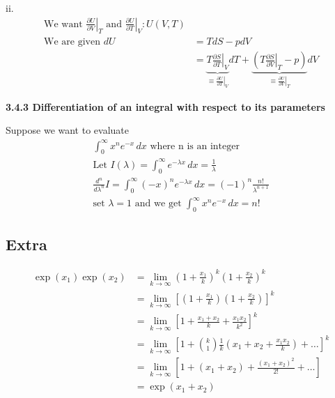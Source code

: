 ii. \begin{align*}
    \text{We want } \left. \frac{\partial U}{\partial V} \right|_{T} \text{ and } \left. \frac{\partial U}{\partial T} \right|_{V} : U(V, T) \\
    \text{We are given } dU &= TdS - pdV \\
    &= \underbrace{T \left. \frac{\partial S}{\partial T} \right|_{V}}_{\equiv \left. \frac{\partial U}{\partial T} \right|_{V}} dT + \underbrace{ \left( T \left. \frac{\partial S}{\partial V} \right|_{T} - p \right)}_{\equiv \left. \frac{\partial U}{\partial V} \right|_{T}} dV
\end{align*} 

\textbf{3.4.3 Differentiation of an integral with respect to its parameters}

\begin{example}
Suppose we want to evaluate
\begin{align*}
    \int_{0}^{\infty} x^n e^{-x} \,dx \text{ where n is an integer} \\
    \text{Let } I(\lambda) = \int_{0}^{\infty} e^{-\lambda x} \,dx = \frac{1}{\lambda} \\
    \frac{d^n}{d \lambda^n} I = \int_{0}^{\infty} (-x)^n e^{-\lambda x} \,dx = (-1)^n \frac{n!}{\lambda^{n + 1}} \\
    \text{set } \lambda = 1 \text{ and we get } \int_{0}^{\infty} x^n e^{-x} \,dx = n!
\end{align*}
\end{example}



\subsection{Extra}

\begin{align*}
    \exp \left(x_1 \right) \exp \left(x_2 \right) &= \lim_{k \to \infty} \left(1 + \frac{x_1}{k}\right)^k \left(1 + \frac{x_2}{k}\right)^k \\
    &= \lim_{k \to \infty} \left[ \left(1 + \frac{x_1}{k}\right)\left(1 + \frac{x_2}{k}\right) \right]^k \\
    &= \lim_{k \to \infty} \left[ 1 + \frac{x_1 + x_2}{k} + \frac{x_1 x_2}{k^2} \right]^k \\
    &= \lim_{k \to \infty} \left[ 1 + \binom{k}{1} \frac{1}{k} \left(x_1 + x_2 + \frac{x_1 x_2}{k} \right) + \dots \right]^k \\
    &= \lim_{k \to \infty} \left[ 1 + \left( x_1 + x_2 \right) + \frac{\left( x_1 + x_2 \right)^2}{2!} + \dots \right] \\
    &= \exp \left( x_1 + x_2 \right)
\end{align*}

